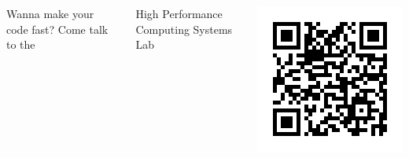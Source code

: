 \documentclass[aspectratio=169]{beamer}
\date{}
\begin{document}
\begin{frame}

  \begin{columns}[t]


    Wanna make your code fast? Come talk to the
    
    \vspace{3em}
    
    
    {\LARGE High Performance Computing Systems Lab}
    

    
    
    
    \includegraphics[width=\linewidth]{figs/hpcs.png}
    
  \end{columns}

  \vspace{2em}

  
  \begin{columns}


\end{columns}
\end{frame}
\end{document}
